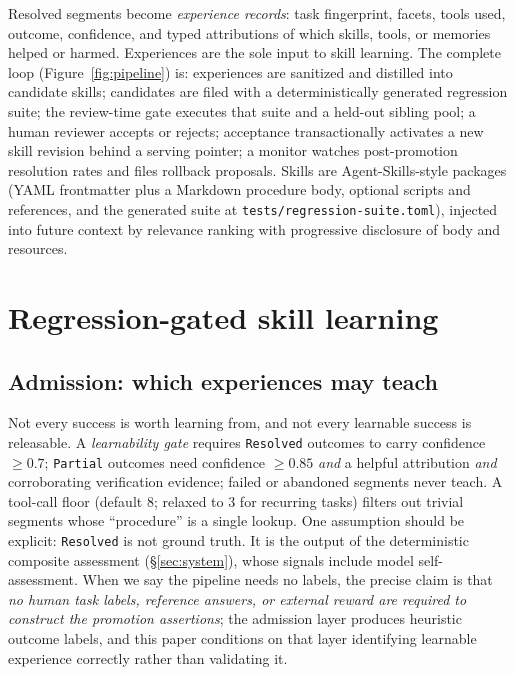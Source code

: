 \documentclass{article}
\newcommand{\code}[1]{\texttt{\small #1}}
\begin{document}
Resolved segments become \emph{experience records}: task fingerprint, facets, tools used, outcome, confidence, and typed attributions of which skills, tools, or memories helped or harmed. Experiences are the sole input to skill learning. The complete loop (Figure~\ref{fig:pipeline}) is: experiences are sanitized and distilled into candidate skills; candidates are filed with a deterministically generated regression suite; the review-time gate executes that suite and a held-out sibling pool; a human reviewer accepts or rejects; acceptance transactionally activates a new skill revision behind a serving pointer; a monitor watches post-promotion resolution rates and files rollback proposals. Skills are Agent-Skills-style packages (YAML frontmatter plus a Markdown procedure body, optional scripts and references, and the generated suite at \code{tests/regression-suite.toml}), injected into future context by relevance ranking with progressive disclosure of body and resources.

\section{Regression-gated skill learning}
\label{sec:method}

\subsection{Admission: which experiences may teach}
\label{sec:admission}

Not every success is worth learning from, and not every learnable success is releasable. A \emph{learnability gate} requires \code{Resolved} outcomes to carry confidence $\geq 0.7$; \code{Partial} outcomes need confidence $\geq 0.85$ \emph{and} a helpful attribution \emph{and} corroborating verification evidence; failed or abandoned segments never teach. A tool-call floor (default 8; relaxed to 3 for recurring tasks) filters out trivial segments whose ``procedure'' is a single lookup. One assumption should be explicit: \code{Resolved} is not ground truth. It is the output of the deterministic composite assessment (\S\ref{sec:system}), whose signals include model self-assessment. When we say the pipeline needs no labels, the precise claim is that \emph{no human task labels, reference answers, or external reward are required to construct the promotion assertions}; the admission layer produces heuristic outcome labels, and this paper conditions on that layer identifying learnable experience correctly rather than validating it.
\end{document}
